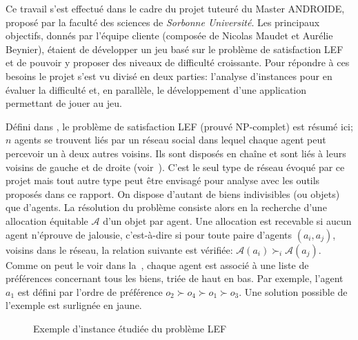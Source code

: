 \documentclass[../main.tex]{subfiles}
\begin{document}
	Ce travail s'est effectué dans le cadre du projet tuteuré du Master ANDROIDE, proposé par la faculté des sciences de \textit{Sorbonne Université}. Les principaux objectifs, donnés par l'équipe cliente (composée de Nicolas Maudet et Aurélie Beynier), étaient de développer un jeu basé sur le problème de satisfaction LEF et de pouvoir y proposer des niveaux de difficulté croissante. Pour répondre à ces besoins le projet s'est vu divisé en deux parties: l'analyse d'instances pour en évaluer la difficulté et, en parallèle, le développement d'une application permettant de jouer au jeu.
	
	Défini dans \cite{lef}, le problème de satisfaction LEF (prouvé NP-complet) est résumé ici; $n$ agents se trouvent liés par un réseau social dans lequel chaque agent peut percevoir un à deux autres voisins. Ils sont disposés en chaîne et sont liés à leurs voisins de gauche et de droite (voir~). C'est le seul type de réseau évoqué par ce projet mais tout autre type peut être envisagé pour analyse avec les outils proposés dans ce rapport. On dispose d'autant de biens indivisibles (ou objets) que d'agents. La résolution du problème consiste alors en la recherche d'une allocation équitable $\mathcal{A}$ d'un objet par agent. Une allocation est recevable si aucun agent n'éprouve de jalousie, c'est-à-dire si pour toute paire d'agents $(a_i, a_j)$, voisins dans le réseau, la relation suivante est vérifiée: $\mathcal{A}(a_i) \succ_{i} \mathcal{A}(a_j)$. Comme on peut le voir dans la~, chaque agent est associé à une liste de préférences concernant tous les biens, triée de haut en bas. Par exemple, l'agent $a_1$ est défini par l'ordre de préférence $o_2 \succ o_4 \succ o_1 \succ o_3$. Une solution possible de l'exemple est surlignée en jaune.
	
	\begin{figure}[ht!]
	    \centering
	    \caption{Exemple d'instance étudiée du problème LEF}
	    \label{fig-lefex}
	\end{figure}
	
\end{document}

